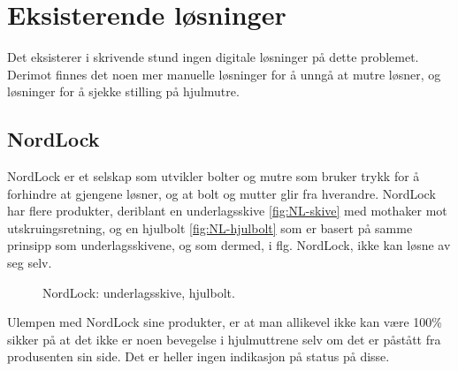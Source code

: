 \section{Eksisterende løsninger}
Det eksisterer i skrivende stund ingen digitale løsninger på dette problemet. 
Derimot finnes det noen mer manuelle løsninger for å unngå at mutre løsner, 
og løsninger for å sjekke stilling på hjulmutre.
\subsection{NordLock}
NordLock er et selskap som utvikler bolter og mutre som bruker trykk for å forhindre 
at gjengene løsner, og at bolt og mutter glir fra hverandre. NordLock har flere 
produkter, deriblant en underlagsskive \ref{fig:NL-skive}\cite{NL-skive} med mothaker mot 
utskruingsretning, og en hjulbolt 
\ref{fig:NL-hjulbolt} \cite{NL-hjulbolt} som er basert på samme prinsipp som 
underlagsskivene, og som dermed, i flg. NordLock, ikke kan løsne av seg selv.
\newline
\begin{figure}[H]
%
\hfill
{}%
\caption{NordLock: \protect{\ref{fig:NL-skive}} underlagsskive, \protect{\ref{fig:NL-hjulbolt}} hjulbolt.}
\end{figure}
Ulempen med NordLock sine produkter, er at man allikevel ikke kan være 100\% sikker
på at det ikke er noen bevegelse i hjulmuttrene selv om det er påstått fra 
produsenten sin side. Det er heller ingen indikasjon på status på disse.

